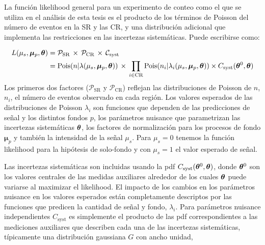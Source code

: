 

La función likelihood general para un experimento de conteo como el que se utiliza
en el análisis de esta tesis es el producto de los términos de Poisson del
número de eventos en la SR y las CR, y una distribución adicional que implementa
las restricciones en las incertezas sistemáticas. Puede escribirse como:

\begin{align}
  L(\mu_s, \bm{\mu}_p, \bm{\theta}) &= \mathcal{P}_\text{SR} \, \times \, \mathcal{P}_\text{CR} \, \times \,
  \mathcal{C}_\text{syst} \nonumber \\
  &= \operatorname{Pois}(n|\lambda(\mu_s, \bm{\mu}_p, \bm{\theta})) \, \times \, \prod_{i \in \text{CR}}
  \operatorname{Pois}(n_i|\lambda_i(\mu_s, \bm{\mu}_p, \bm{\theta})) \times C_\text{syst} (\bm{\theta}^0, \bm{\theta}) \label{eq:model}
\end{align}
%
Los primeros dos factores ($\mathcal{P}_\text{SR}$ y $\mathcal{P}_\text{CR}$)
reflejan las distribuciones de Poisson de $n$, $n_i$, el número de eventos observado
en cada región. Los valores esperados de las distribuciones de Poisson $\lambda_i$ son
funciones que dependen de las predicciones de señal y los distintos fondos $p$,
los parámetros nuisance que parametrizan las incertezas sistemáticas $\bm{\theta}$,
los factores de normalización para los procesos de fondo $\bm{\mu}_p$ y también
la intensidad de la señal $\mu_s$. Para $\mu_s = 0$ tenemos la
función likelihood para la hipótesis de solo-fondo y con $\mu_s = 1$ el
valor esperado de señal. %

Las incertezas sistemáticas son incluidas usando la pdf
$C_\text{syst}(\bm{\theta}^0, \bm{\theta})$, donde $\bm{\theta}^0$ son los valores centrales
de las medidas auxiliares alrededor de los cuales $\bm{\theta}$ puede variarse al
maximizar el likelihood. El impacto de los cambios en los parámetros nuisance
en los valores esperados están completamente descriptos por las funciones que
predicen la cantidad de señal y fondo, $\lambda_i$. Para parámetros nuisance
independientes $C_\text{syst}$ es simplemente el producto de las pdf
correspondientes a las mediciones auxiliares que describen cada una de las
incertezas sistemáticas, típicamente una distribución gaussiana $G$ con ancho
unidad,

